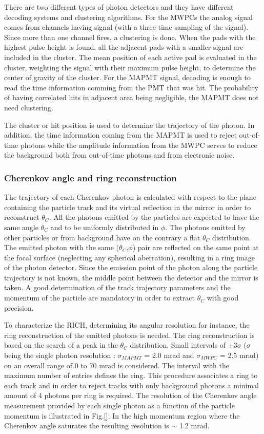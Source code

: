There are two different types of photon detectors and they have different decoding systems and clustering algorithms. For the MWPCs the analog signal comes from channels
having signal (with a three-time sampling of the signal)\cite{}. Since more than one channel fires, a clustering is done. When the pads with the highest pulse height is
found, all the adjacent pads with a smaller signal are included in the cluster\cite{}. The mean position of each active pad is evaluated in the cluster, weighting the
signal with their maximum pulse height, to determine the center of gravity of the cluster. For the MAPMT signal, decoding is enough to read the time information comming
from the PMT that was hit. The probability of having correlated hits in adjacent area being negligible, the MAPMT does not need clustering\cite{}.

The cluster or hit position is used to determine the trajectory of the photon. In addition, the time information coming from the MAPMT is used to reject out-of-time
photons while the amplitude information from the MWPC serves to reduce the background both from out-of-time photons and from electronic noise.\cite{}

\subsubsection*{Cherenkov angle and ring reconstruction}

The trajectory of each Cherenkov photon is calculated with respect to the plane containing the particle track and its virtual reflection in the mirror in order to
reconstruct $\theta_C$\cite{}. All the photons emitted by the particles are expected to have the same angle $\theta_C$ and to be uniformly distributed in $\phi$.
The photons emitted by other particles or from background have on the contrary a flat $\theta_C$ distribution. The emitted photon with the same ($\theta_C$,$\phi$)
pair are reflected on the same point at the focal surface (neglecting any spherical aberration), resulting in a ring image of the photon detector. Since the emission
point of the photon along the particle trajectory is not known, the middle point between the detector and the mirror is taken. A good determination of the track trajectory
parameters and the momentum of the particle are mandatory in order to extract $\theta_C$ with good precision.

To characterize the RICH, determining its angular resolution for instance, the ring reconstruction of the emitted photons is needed. The ring reconstruction is based on the
search of a peak in the $\theta_C$ distribution. Small intervals of $\pm$3$\sigma$ ($\sigma$ being the single photon resolution : $\sigma_{MAPMT}$ = 2.0 mrad and
$\sigma_{MWPC}$ = 2.5 mrad) on an overall range of 0 to 70 mrad is considered. The interval with the maximum number of entries defines the ring. This procedure associates
a ring to each track and in order to reject tracks with only background photons a minimal amount of 4 photons per ring is required\cite{}. The resolution of the
Cherenkov angle measurement provided by each single photon as a function of the particle momentum is illustrated in Fig.\ref{}. In the high momentum region where
the Cherenkov angle saturates the resulting resolution is $\sim$ 1.2 mrad.

